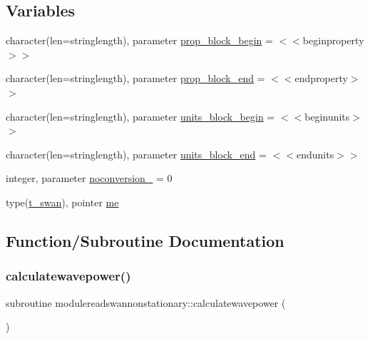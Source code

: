 \subsection*{Variables}
\begin{DoxyCompactItemize}
\item 
character(len=stringlength), parameter \mbox{\hyperlink{namespacemodulereadswannonstationary_a49b70911a8192a84cf1ee4184e95069e}{prop\+\_\+block\+\_\+begin}} = \textquotesingle{}$<$$<$beginproperty$>$$>$\textquotesingle{}
\item 
character(len=stringlength), parameter \mbox{\hyperlink{namespacemodulereadswannonstationary_ae64bbd606aac4edda645ed73e9fd7342}{prop\+\_\+block\+\_\+end}} = \textquotesingle{}$<$$<$endproperty$>$$>$\textquotesingle{}
\item 
character(len=stringlength), parameter \mbox{\hyperlink{namespacemodulereadswannonstationary_a3bfcd82f3cfda93a9ca86cdb6a3bd39c}{units\+\_\+block\+\_\+begin}} = \textquotesingle{}$<$$<$beginunits$>$$>$\textquotesingle{}
\item 
character(len=stringlength), parameter \mbox{\hyperlink{namespacemodulereadswannonstationary_a2523cfc89ab979041c4b91a534e60cf0}{units\+\_\+block\+\_\+end}} = \textquotesingle{}$<$$<$endunits$>$$>$\textquotesingle{}
\item 
integer, parameter \mbox{\hyperlink{namespacemodulereadswannonstationary_aa944582a0a1b3c5a5141261697feb2ad}{noconversion\+\_\+}} = 0
\item 
type(\mbox{\hyperlink{structmodulereadswannonstationary_1_1t__swan}{t\+\_\+swan}}), pointer \mbox{\hyperlink{namespacemodulereadswannonstationary_a540bd39474b6ce05d78950b2abf1c1af}{me}}
\end{DoxyCompactItemize}


\subsection{Function/\+Subroutine Documentation}
\mbox{\label{namespacemodulereadswannonstationary_a8c548e44bcbe106ea2fb8ef9f9aae7a1}} 
\subsubsection{\texorpdfstring{calculatewavepower()}{calculatewavepower()}}
{\footnotesize\ttfamily subroutine modulereadswannonstationary\+::calculatewavepower (\begin{DoxyParamCaption}{ }\end{DoxyParamCaption})\hspace{0.3cm}{\ttfamily [private]}}

